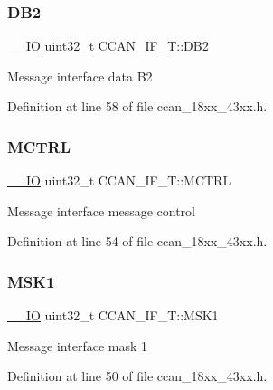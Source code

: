 \subsubsection{\texorpdfstring{D\+B2}{DB2}}
{\footnotesize\ttfamily \hyperlink{core__sc300_8h_aec43007d9998a0a0e01faede4133d6be}{\+\_\+\+\_\+\+IO} uint32\+\_\+t C\+C\+A\+N\+\_\+\+I\+F\+\_\+\+T\+::\+D\+B2}

Message interface data B2 

Definition at line 58 of file ccan\+\_\+18xx\+\_\+43xx.\+h.

\mbox{\label{struct_c_c_a_n___i_f___t_a1f22576d88eeb7c35f81cc5231f80171}} 
\subsubsection{\texorpdfstring{M\+C\+T\+RL}{MCTRL}}
{\footnotesize\ttfamily \hyperlink{core__sc300_8h_aec43007d9998a0a0e01faede4133d6be}{\+\_\+\+\_\+\+IO} uint32\+\_\+t C\+C\+A\+N\+\_\+\+I\+F\+\_\+\+T\+::\+M\+C\+T\+RL}

Message interface message control 

Definition at line 54 of file ccan\+\_\+18xx\+\_\+43xx.\+h.

\mbox{\label{struct_c_c_a_n___i_f___t_a034a29eef01979bb2e361091cd886304}} 
\subsubsection{\texorpdfstring{M\+S\+K1}{MSK1}}
{\footnotesize\ttfamily \hyperlink{core__sc300_8h_aec43007d9998a0a0e01faede4133d6be}{\+\_\+\+\_\+\+IO} uint32\+\_\+t C\+C\+A\+N\+\_\+\+I\+F\+\_\+\+T\+::\+M\+S\+K1}

Message interface mask 1 

Definition at line 50 of file ccan\+\_\+18xx\+\_\+43xx.\+h.

\mbox{\label{struct_c_c_a_n___i_f___t_a6e21bcd1d7eb43db030d736e64014116}} 
